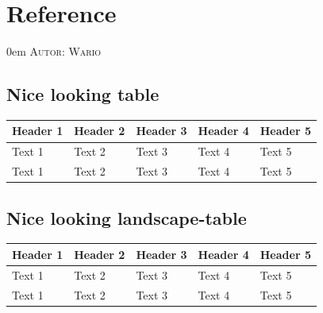 \documentclass{article}
\makeatletter
\newcommand{\sectionauthor}[1]{
	{\parindent 0em \large \scshape Autor: #1 \par \nobreak \vspace*{1em}}
	\@afterheading
}
\makeatother
\begin{document}
\newpage

\section{Reference}
\sectionauthor{Wario}

\subsection{Nice looking table}
\begin{longtable}{@{}lllll@{}}
\toprule
\textbf{Header 1} & \textbf{Header 2} & \textbf{Header 3} & \textbf{Header 4} & \textbf{Header 5} \\* \midrule
\endfirsthead
%
\endhead
%
Text 1            & Text 2            & Text 3            & Text 4            & Text 5            \\
Text 1            & Text 2            & Text 3            & Text 4            & Text 5            \\* \bottomrule
\end{longtable}

\subsection{Nice looking landscape-table}
\begin{landscape}
\begin{longtable}{@{}lllll@{}}
\toprule
\textbf{Header 1} & \textbf{Header 2} & \textbf{Header 3} & \textbf{Header 4} & \textbf{Header 5} \\* \midrule
\endfirsthead
%
\endhead
%
Text 1            & Text 2            & Text 3            & Text 4            & Text 5            \\
Text 1            & Text 2            & Text 3            & Text 4            & Text 5            \\* \bottomrule
\end{longtable}
\end{landscape}

\newpage
\end{document}

